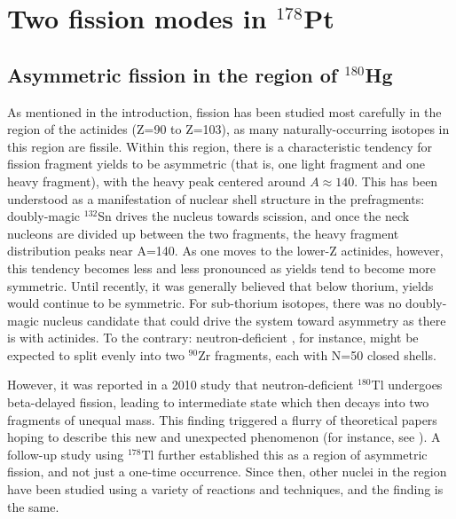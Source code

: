 \chapter{Two fission modes in $^{178}$Pt}\label{chap:178Pt}

\section{Asymmetric fission in the region of $^{180}$Hg}
As mentioned in the introduction, fission has been studied most carefully in the region of the actinides (Z=90 to Z=103), as many naturally-occurring isotopes in this region are fissile. Within this region, there is a characteristic tendency for fission fragment yields to be asymmetric (that is, one light fragment and one heavy fragment), with the heavy peak centered around $A\approx140$. This has been understood as a manifestation of nuclear shell structure in the prefragments: doubly-magic $^{132}$Sn drives the nucleus towards scission, and once the neck nucleons are divided up between the two fragments, the heavy fragment distribution peaks near A=140. As one moves to the lower-Z actinides, however, this tendency becomes less and less pronounced as yields tend to become more symmetric. Until recently, it was generally believed that below thorium, yields would continue to be symmetric. For sub-thorium isotopes, there was no doubly-magic nucleus candidate that could drive the system toward asymmetry as there is with actinides. To the contrary: neutron-deficient {\Hg}, for instance, might be expected to split evenly into two $^{90}$Zr fragments, each with N=50 closed shells.

However, it was reported in a 2010 study \cite{Andreyev2010} that neutron-deficient $^{180}$Tl undergoes beta-delayed fission, leading to intermediate state {\Hg} which then decays into two fragments of unequal mass. This finding triggered a flurry of theoretical papers hoping to describe this new and unexpected phenomenon (for instance, see \cite{Warda2012,Moller2012,Mcdonnell2014,Ichikawa2019}). A follow-up study using $^{178}$Tl \cite{Liberati2013} further established this as a region of asymmetric fission, and not just a one-time occurrence. Since then, other nuclei in the region have been studied using a variety of reactions and techniques, and the finding is the same. 


